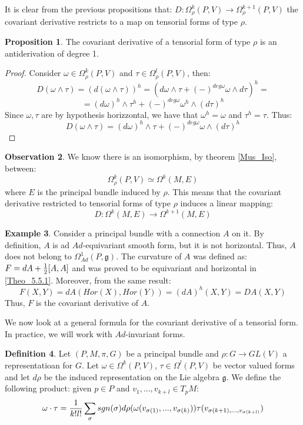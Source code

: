 \documentclass[12pt,a4paper]{report}
\theoremstyle{definition}
\newtheorem{Def}{Definition}[chapter]
\theoremstyle{Theorem}
\newtheorem{Prop}[Def]{Proposition}
\theoremstyle{definition}
\newtheorem{Ex}[Def]{Example}
\theoremstyle{definition}
\newtheorem{Obs}[Def]{Observation}
\begin{document}
	It is clear from the previous propositions that: $D:\Omega^k_\rho(P,V)\rightarrow \Omega^{k+1}_\rho(P,V)$ the covariant derivative restricts to a map on tensorial forms of type $\rho$.
	\begin{Prop}
		The covariant derivative of a tensorial form of type $\rho$ is an antiderivation of degree 1.
	\end{Prop}
	\begin{proof}
		Consider $\omega\in\Omega^k_\rho(P,V)$ and $\tau\in \Omega^l_\rho(P,V)$, then:
		$$D(\omega\wedge \tau)=(d(\omega\wedge\tau))^h=(d\omega\wedge \tau+(-)^{deg\omega}\omega\wedge  d\tau)^h=$$
		$$=(d\omega)^h\wedge \tau^h+(-)^{deg\omega}\omega^h\wedge(  d\tau)^h$$
		Since $\omega,\tau$ are by hypothesis horizzontal, we have that $\omega^h=\omega$ and $\tau^h=\tau$. Thus:
		$$D(\omega\wedge \tau)=(d\omega)^h\wedge \tau+(-)^{deg\omega}\omega\wedge (d\tau)^h$$
	\end{proof}
	\begin{Obs}
		We know there is an isomorphism, by theorem \ref{Mus_Iso}, between:
		$$\Omega^k_\rho(P,V)\simeq\Omega^k(M,E)$$ where $E$ is the principal bundle induced by $\rho$. This means that the covariant derivative restricted to tensorial forms of type $\rho$ induces a linear mapping:
		$$D:\Omega^k(M,E)\rightarrow\Omega^{k+1}(M,E)$$
	\end{Obs}
	\begin{Ex}\label{Ex_6.3.1}
		Consider a principal bundle with a connection $A$ on it. By definition, $A$ is ad $Ad$-equivariant smooth form, but it is not horizontal. Thus, $A$ does not belong to $\Omega^1_{Ad}(P,\mathfrak{g})$. The curvature of $A$ was defined as:
		$F=dA+{1\over 2}[A,A]$ and was proved to be equivariant and horizontal in \ref{Theo_5.5.1}. Moreover, from the same result:
		$$F(X,Y)=dA(Hor(X),Hor(Y))=(dA)^h(X,Y)=DA(X,Y)$$
		Thus, $F$ is the covariant derivative of $A$.
	\end{Ex}
	We now look at a general formula for the covariant derivative of a tensorial form. In practice, we will work with $Ad$-invariant forms.
	\begin{Def}\label{Def_6.3.3}
		Let $(P,M,\pi,G)$ be a principal bundle and $\rho:G\rightarrow GL(V)$ a representatioan for $G$. Let $\omega\in \Omega^k(P,V)$, $\tau\in\Omega^l(P,V)$ be vector valued forms and let $d\rho$ be the induced representation on the Lie algebra $\mathfrak{g}$. We define the following product: given $p\in P$ and $v_1,...,v_{k+l}\in T_pM$:
		$$\omega\cdot \tau={1\over k!l!}\sum_\sigma sgn(\sigma)d\rho(\omega(v_{\sigma(1)},...,v_{\sigma(k)}))\tau(v_{\sigma(k+1),...,v_{\sigma(k+l)}})$$
	\end{Def}
\end{document}
